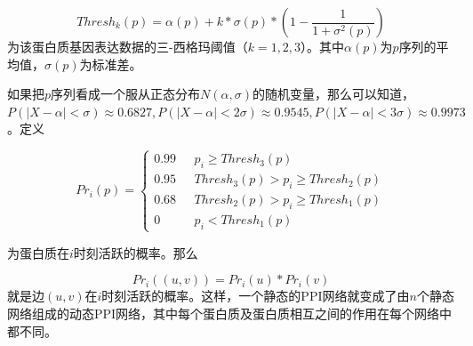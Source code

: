 \begin{equation}\label{dppi2}
Thresh_k(p)=\alpha (p)+k*\sigma (p)*\left (1-\frac{1}{1+\sigma ^2(p)}\right )
\end{equation}
为该蛋白质基因表达数据的三-西格玛阈值（$k=1,2,3$）。其中$\alpha (p)$为$p$序列的平均值，$\sigma (p)$为标准差。

如果把$p$序列看成一个服从正态分布$N(\alpha,\sigma)$的随机变量，那么可以知道，$P(|X-\alpha|<\sigma)\approx 0.6827,P(|X-\alpha|<2\sigma)\approx 0.9545,P(|X-\alpha|<3\sigma)\approx 0.9973$。定义

\begin{equation}\label{dppi3}
Pr_i(p)= \begin{cases}
0.99 & \text{  } p_i\geq Thresh_3(p)\\ 
0.95 & \text{  } Thresh_3(p)> p_i\geq Thresh_2(p) \\ 
0.68 & \text{  } Thresh_2(p)> p_i\geq Thresh_1(p) \\ 
0 & \text{  } p_i<Thresh_1(p) 
\end{cases}
\end{equation}


为蛋白质在$i$时刻活跃的概率。那么

\begin{equation}\label{dppi4}
Pr_i((u,v))= Pr_i(u)*Pr_i(v)
\end{equation}
就是边$(u,v)$在$i$时刻活跃的概率。这样，一个静态的PPI网络就变成了由$n$个静态网络组成的动态PPI网络，其中每个蛋白质及蛋白质相互之间的作用在每个网络中都不同。